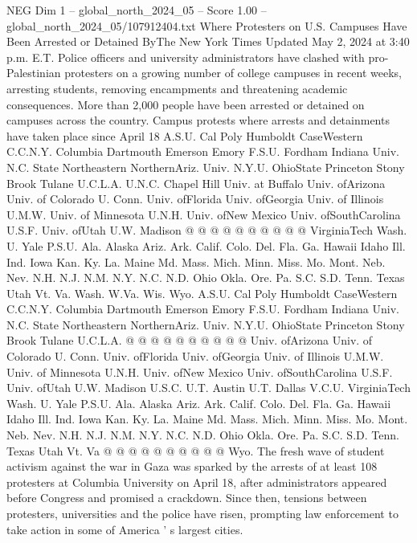 \begin{textsample}{NEG Dim 1 – global\_north\_2024\_05 – Score 1.00 – global\_north\_2024\_05/107912404.txt}  \label{ex:f1_neg_176}
Where Protesters on U.S.
Campuses Have Been Arrested or Detained ByThe New York Times Updated May 2, 2024 at 3:40 p.m.
E.T.
Police officers and university administrators have clashed with pro-Palestinian protesters on a growing number of college campuses in recent weeks, arresting students, removing encampments and threatening academic consequences.
More than 2,000 people have been arrested or detained on campuses across the country.
Campus protests where arrests and detainments have taken place since April 18 A.S.U.
Cal Poly Humboldt CaseWestern C.C.N.Y.
Columbia Dartmouth Emerson Emory F.S.U.
Fordham Indiana Univ.
N.C.
State Northeastern NorthernAriz.
Univ.
N.Y.U.
OhioState Princeton Stony Brook Tulane U.C.L.A.
U.N.C.
Chapel Hill Univ. at Buffalo Univ. ofArizona Univ. of Colorado U.
Conn.
Univ. ofFlorida Univ. ofGeorgia Univ. of Illinois U.M.W.
Univ. of Minnesota U.N.H.
Univ. ofNew Mexico Univ. ofSouthCarolina U.S.F.
Univ. ofUtah U.W.
Madison @ @ @ @ @ @ @ @ @ @ VirginiaTech Wash.
U.
Yale P.S.U.
Ala.
Alaska Ariz.
Ark.
Calif.
Colo.
Del.
Fla.
Ga.
Hawaii Idaho Ill.
Ind.
Iowa Kan.
Ky.
La.
Maine Md.
Mass.
Mich.
Minn.
Miss.
Mo.
Mont.
Neb.
Nev.
N.H.
N.J.
N.M.
N.Y.
N.C.
N.D.
Ohio Okla.
Ore.
Pa.
S.C.
S.D.
Tenn.
Texas Utah Vt.
Va.
Wash.
W.Va.
Wis.
Wyo.
A.S.U.
Cal Poly Humboldt CaseWestern C.C.N.Y.
Columbia Dartmouth Emerson Emory F.S.U.
Fordham Indiana Univ.
N.C.
State Northeastern NorthernAriz.
Univ.
N.Y.U.
OhioState Princeton Stony Brook Tulane U.C.L.A. @ @ @ @ @ @ @ @ @ @ Univ. ofArizona Univ. of Colorado U.
Conn.
Univ. ofFlorida Univ. ofGeorgia Univ. of Illinois U.M.W.
Univ. of Minnesota U.N.H.
Univ. ofNew Mexico Univ. ofSouthCarolina U.S.F.
Univ. ofUtah U.W.
Madison U.S.C.
U.T.
Austin U.T.
Dallas V.C.U.
VirginiaTech Wash.
U.
Yale P.S.U.
Ala.
Alaska Ariz.
Ark.
Calif.
Colo.
Del.
Fla.
Ga.
Hawaii Idaho Ill.
Ind.
Iowa Kan.
Ky.
La.
Maine Md.
Mass.
Mich.
Minn.
Miss.
Mo.
Mont.
Neb.
Nev.
N.H.
N.J.
N.M.
N.Y.
N.C.
N.D.
Ohio Okla.
Ore.
Pa.
S.C.
S.D.
Tenn.
Texas Utah Vt.
Va @ @ @ @ @ @ @ @ @ @ Wyo.
The fresh wave of student activism against the war in Gaza was sparked by the arrests of at least 108 protesters at Columbia University on April 18, after administrators appeared before Congress and promised a crackdown.
Since then, tensions between protesters, universities and the police have risen, prompting law enforcement to take action in some of America ' s largest cities.

\end{textsample}
